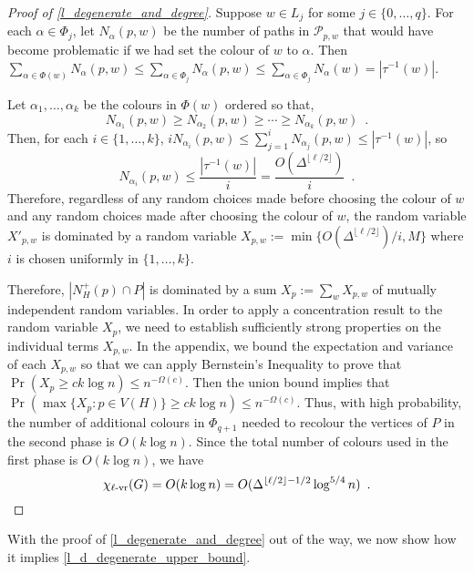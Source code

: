 \documentclass{patmorin}
\newcommand{\rn}[1]{\chi_{\operatorname{#1-vr}}}
\newcommand{\lrn}{\rn{\ell}}
\begin{document}
\begin{proof}[Proof of \cref{l_degenerate_and_degree}]
  Suppose $w\in L_j$ for some $j\in\{0,\ldots,q\}$.  For each $\alpha\in\Phi_j$, let $N_\alpha(p,w)$ be the number of paths in $\mathcal{P}_{p,w}$ that would have become problematic if we had set the colour of $w$ to $\alpha$. Then $\sum_{\alpha\in\Phi(w)} N_\alpha(p,w) \le \sum_{\alpha\in\Phi_j} N_\alpha(p,w) \le \sum_{\alpha\in\Phi_j} N_\alpha(w) = |\tau^{-1}(w)|$.

  Let $\alpha_1,\ldots,\alpha_k$ be the colours in $\Phi(w)$ ordered so that,
  \[
    N_{\alpha_1}(p,w) \ge N_{\alpha_2}(p,w) \ge\cdots\ge N_{\alpha_k}(p,w) \enspace .
  \]
  Then, for each $i\in\{1,\ldots,k\}$, $iN_{\alpha_i}(p,w)\le\sum_{j=1}^i N_{\alpha_j}(p,w) \le |\tau^{-1}(w)|$, so
  \[
    N_{\alpha_i}(p,w)\le \frac{|\tau^{-1}(w)|}{i}=\frac{O(\Delta^{\lfloor\ell/2\rfloor})}{i} \enspace .
  \]
  Therefore, regardless of any random choices made before choosing the colour of $w$ and any random choices made after choosing the colour of $w$, the random variable $X'_{p,w}$ is dominated by a random variable $X_{p,w}:=\min\{O(\Delta^{\lfloor\ell/2\rfloor})/i,M\}$ where $i$ is chosen uniformly in $\{1,\ldots,k\}$.

  Therefore, $|N_H^+(p)\cap P|$ is dominated by a sum $X_p:=\sum_{w} X_{p,w}$ of mutually independent random variables.  In order to apply a concentration result to the random variable $X_p$, we need to  establish sufficiently strong properties on the individual terms $X_{p,w}$.  In the appendix, we bound the expectation and variance of each $X_{p,w}$ so that we can apply Bernstein's Inequality to prove that $\Pr(X_p\ge ck\log n)\le n^{-\Omega(c)}$.  Then the union bound implies that $\Pr(\max\{X_p:p\in V(H)\} \ge ck\log n)\le n^{-\Omega(c)}$.  Thus, with high probability, the number of additional colours in $\Phi_{q+1}$ needed to recolour the vertices of $P$ in the second phase is $O(k\log n)$.  Since the total number of colours used in the first phase is $O(k\log n)$, we have
  \[
    \lrn(G) = O(k \log n) = O(\Delta^{\lfloor\ell/2\rfloor-1/2}\log^{5/4} n) \enspace . \qedhere
  \]
\end{proof}

With the proof of \cref{l_degenerate_and_degree} out of the way, we now show how it implies \cref{l_d_degenerate_upper_bound}.
\end{document}
